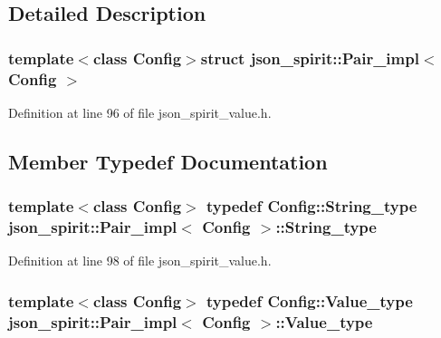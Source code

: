 \subsection{Detailed Description}
\subsubsection*{template$<$class Config$>$struct json\+\_\+spirit\+::\+Pair\+\_\+impl$<$ Config $>$}



Definition at line 96 of file json\+\_\+spirit\+\_\+value.\+h.



\subsection{Member Typedef Documentation}
\hypertarget{structjson__spirit_1_1_pair__impl_a76ee499775d02d1038a2b8c71621f2c8}{}
\subsubsection[{String\+\_\+type}]{\setlength{\rightskip}{0pt plus 5cm}template$<$class Config$>$ typedef {\bf Config\+::\+String\+\_\+type} {\bf json\+\_\+spirit\+::\+Pair\+\_\+impl}$<$ {\bf Config} $>$\+::{\bf String\+\_\+type}}\label{structjson__spirit_1_1_pair__impl_a76ee499775d02d1038a2b8c71621f2c8}


Definition at line 98 of file json\+\_\+spirit\+\_\+value.\+h.

\hypertarget{structjson__spirit_1_1_pair__impl_aa679fec3c6ec4c76f94460d3815cf1fb}{}
\subsubsection[{Value\+\_\+type}]{\setlength{\rightskip}{0pt plus 5cm}template$<$class Config$>$ typedef {\bf Config\+::\+Value\+\_\+type} {\bf json\+\_\+spirit\+::\+Pair\+\_\+impl}$<$ {\bf Config} $>$\+::{\bf Value\+\_\+type}}\label{structjson__spirit_1_1_pair__impl_aa679fec3c6ec4c76f94460d3815cf1fb}


